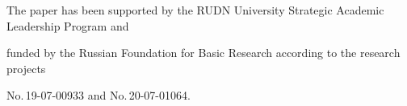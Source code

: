 












\vspace*{-12pt}





\Ack


\noindent


The paper has been supported by the RUDN University Strategic Academic Leadership Program and 


funded by the Russian Foundation for Basic Research according to the research projects 


No.\,19-07-00933 and No.\,20-07-01064.


\vspace*{3pt}






